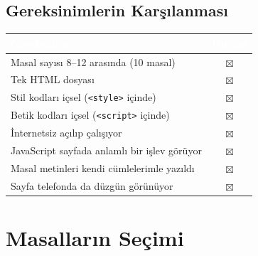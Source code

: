 \documentclass[12pt,a4paper]{article}
\begin{document}
\subsection{Gereksinimlerin Karşılanması}
\begin{center}
\begin{tabular}{@{}p{8.2cm}c@{}}
\toprule
\rowcolor{ana}\textcolor{white}{\textbf{Gereksinim}} & \textcolor{white}{\textbf{Durum}} \\
\midrule
Masal sayısı 8--12 arasında (10 masal)         & $\boxtimes$ \\
Tek HTML dosyası                                    & $\boxtimes$ \\
Stil kodları içsel (\texttt{<style>} içinde)        & $\boxtimes$ \\
Betik kodları içsel (\texttt{<script>} içinde)      & $\boxtimes$ \\
İnternetsiz açılıp çalışıyor                        & $\boxtimes$ \\
JavaScript sayfada anlamlı bir işlev görüyor        & $\boxtimes$ \\
Masal metinleri kendi cümlelerimle yazıldı          & $\boxtimes$ \\
Sayfa telefonda da düzgün görünüyor                 & $\boxtimes$ \\
\bottomrule
\end{tabular}
\end{center}


\section{Masalların Seçimi}
\end{document}
